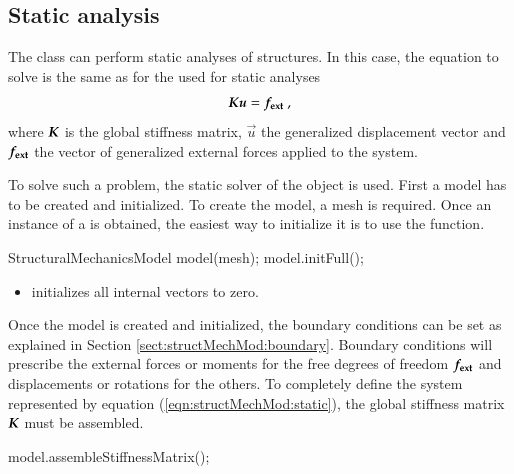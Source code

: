 \subsection{Static analysis\label{sect:structMechMod:static}}

The    class   can  perform  static  analyses  of
structures.  In  this case,  the  equation  to solve  is  the  same  as for  the
 used for static analyses
\begin{equation}\label{eqn:structMechMod:static}
  \boldsymbol{K} \boldsymbol{u} = \boldsymbol{f_{{\mathrm{ext}}}}~,
\end{equation}
where  $\boldsymbol{K}$ is  the  global stiffness  matrix,  $\vec{u}$ the  generalized displacement 
vector  and  $\boldsymbol{f_{{\mathrm{ext}}}}$ the  vector of generalized external  forces   applied to  the
system.


To     solve    such     a    problem,     the    static     solver     of    the
  object is used.   First a
model has to be  created and initialized.  To create the model,  a mesh is required.
Once an instance of a  is obtained, the easiest way to
initialize it is  to use the 
function.

\begin{cpp}
  StructuralMechanicsModel model(mesh);
  model.initFull();
\end{cpp}


\begin{itemize}
\item {}  initializes all internal vectors to zero.
\end{itemize}


Once the model is created and  initialized, the boundary conditions can be set as
explained   in  Section   \ref{sect:structMechMod:boundary}.   Boundary   conditions  will
prescribe   the   external   forces or moments    for   the   free   degrees   of   freedom
$\boldsymbol{f_{{\mathrm{ext}}}}$ and displacements or rotations for the others.  To completely define the
system  represented  by equation  (\ref{eqn:structMechMod:static}),  the global  stiffness
matrix            $\boldsymbol{K}$             must            be            assembled.

\begin{cpp}
  model.assembleStiffnessMatrix();
\end{cpp}

